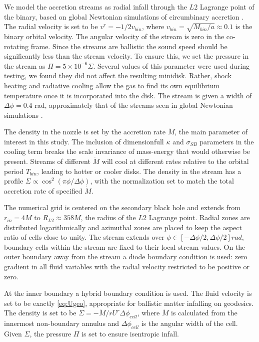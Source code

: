 \documentclass{emulateapj}
\newcommand{\De}{\Delta}
\newcommand{\sig}{\sigma}
\newcommand{\Sig}{\Sigma}
\newcommand{\ka}{\kappa}
\begin{document}
We model the accretion streams as radial infall through the $L2$ Lagrange point of the binary, based on global Newtonian simulations of circumbinary accretion \citep{Farris14, Farris15A, Farris15B, DOrazio12, DOrazio16}.  The radial velocity is set to be $v^r = -1/2 v_{bin}$, where $v_{bin} = \sqrt{M_{bin}/a} \approx 0.1$ is the binary orbital velocity.  The angular velocity of the stream is zero in the co-rotating frame.  Since the streams are ballistic the sound speed should be significantly less than the stream velocity.  To ensure this, we set the pressure in the stream as $\Pi = 5 \times 10^{-6} \Sig$.  Several values of this parameter were used during testing, we found they did not affect the resulting minidisk. Rather, shock heating and radiative cooling allow the gas to find its own equilibrium temperature once it is incorporated into the disk.  The stream is given a width of $ \De \phi = 0.4$ rad, approximately that of the streams seen in global Newtonian simulations \cite{Farris14}.

The density in the nozzle is set by the accretion rate $\dot{M}$, the main parameter of interest in this study.  The inclusion of dimensionfull $\ka$ and $\sig_{SB}$ parameters in the cooling term breaks the scale invariance of mass-energy that would otherwise be present.  Streams of different $\dot{M}$ will cool at different rates relative to the orbital period $T_{bin}$, leading to hotter or cooler disks.  The density in the stream has a profile $\Sig \propto \cos^2(\pi \phi / \De \phi)$, with the normalization set to match the total accretion rate of specified $\dot{M}$.

The numerical grid is centered on the secondary black hole and extends from $r_{in} = 4 M$ to $R_{L2} \approx 358 M$, the radius of the $L2$ Lagrange point. Radial zones are distributed logarithmically and azimuthal zones are placed to keep the aspect ratio of cells close to unity. The stream extends over $\phi \in [-\De \phi / 2, \De \phi / 2] rad$, boundary cells within the stream are fixed to their local stream values. On the outer boundary away from the stream a diode boundary condition is used: zero gradient in all fluid variables with the radial velocity restricted to be positive or zero.

At the inner boundary a hybrid boundary condition is used.  The fluid velocity is set to be exactly \eqref{eq:Ugeo}, appropriate for ballistic matter infalling on geodesics.  The density is set to be $\Sig = -\dot{M} / r U^r \De \phi_{cell}$, where $\dot{M}$ is calculated from the innermost non-boundary annulus and $\De \phi_{cell}$ is the angular width of the cell.  Given $\Sig$, the pressure $\Pi$ is set to ensure isentropic infall.
\end{document}
